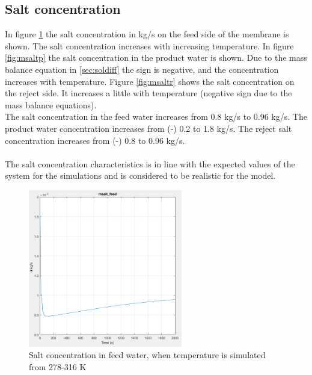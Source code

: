 \subsection{Salt concentration}
In figure \ref{fig:msaltf} the salt concentration in kg/s on the feed side of the membrane is shown. The salt concentration increases with increasing temperature. In figure \ref{fig:msaltp} the salt concentration in the product water is shown. Due to the mass balance equation in \ref{sec:soldiff} the sign is negative, and the concentration increases with temperature. Figure \ref{fig:msaltr} shows the salt concentration on the reject side. It increases a little with temperature (negative sign due to the mass balance equations).\\
The salt concentration in the feed water increases from  0.8 kg/s to 0.96 kg/s. The product water concentration increases from (-) 0.2 to 1.8 kg/s. The reject salt concentration increases from (-) 0.8 to 0.96 kg/s.\\
\\
The salt concentration characteristics is in line with the expected values of the system for the simulations and is considered to be realistic for the model. 
\begin{figure}[H]
\centering
    \includegraphics[width=0.6\textwidth]{msalt_feed.PNG}
    \caption{Salt concentration in feed water, when temperature is simulated from 278-316 K}
    \label{fig:msaltf}
\end{figure}

